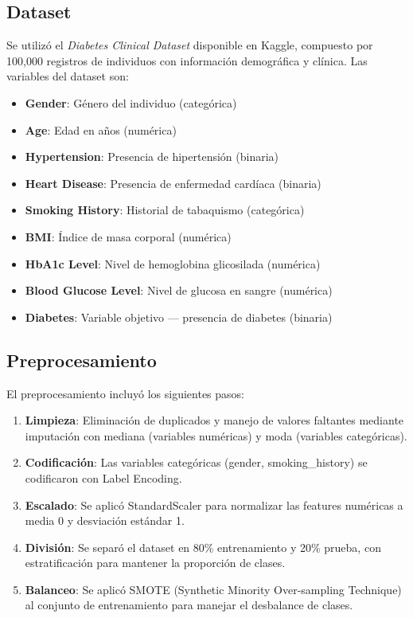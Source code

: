 \documentclass[conference]{IEEEtran}
\begin{document}
\subsection{Dataset}

Se utilizó el \textit{Diabetes Clinical Dataset} disponible en Kaggle, compuesto por 100,000 registros de individuos con información demográfica y clínica. Las variables del dataset son:

\begin{itemize}
    \item \textbf{Gender}: Género del individuo (categórica)
    \item \textbf{Age}: Edad en años (numérica)
    \item \textbf{Hypertension}: Presencia de hipertensión (binaria)
    \item \textbf{Heart Disease}: Presencia de enfermedad cardíaca (binaria)
    \item \textbf{Smoking History}: Historial de tabaquismo (categórica)
    \item \textbf{BMI}: Índice de masa corporal (numérica)
    \item \textbf{HbA1c Level}: Nivel de hemoglobina glicosilada (numérica)
    \item \textbf{Blood Glucose Level}: Nivel de glucosa en sangre (numérica)
    \item \textbf{Diabetes}: Variable objetivo — presencia de diabetes (binaria)
\end{itemize}

\subsection{Preprocesamiento}

El preprocesamiento incluyó los siguientes pasos:

\begin{enumerate}
    \item \textbf{Limpieza}: Eliminación de duplicados y manejo de valores faltantes mediante imputación con mediana (variables numéricas) y moda (variables categóricas).
    \item \textbf{Codificación}: Las variables categóricas (gender, smoking\_history) se codificaron con Label Encoding.
    \item \textbf{Escalado}: Se aplicó StandardScaler para normalizar las features numéricas a media 0 y desviación estándar 1.
    \item \textbf{División}: Se separó el dataset en 80\% entrenamiento y 20\% prueba, con estratificación para mantener la proporción de clases.
    \item \textbf{Balanceo}: Se aplicó SMOTE (Synthetic Minority Over-sampling Technique) \cite{chawla2002} al conjunto de entrenamiento para manejar el desbalance de clases.
\end{enumerate}
\end{document}

